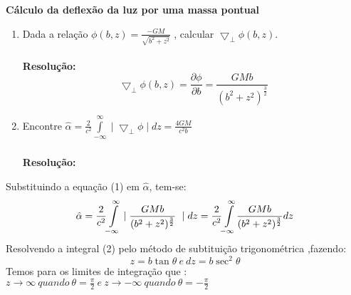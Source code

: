 \documentclass[12pt,a4paper]{article}
\author{Juliene Vargens}
\begin{document}
\begin{center}
\textbf{Cálculo da deflexão da luz por uma massa pontual }\\
\end{center}

\begin{enumerate}

\paragraph{}
\item Dada a relação
$\phi(b,z)=\frac{-GM}{\sqrt{b^2+z^2}}$ , calcular 
$\bigtriangledown_{\perp}\phi(b,z)$.

\paragraph{}\textbf{Resolução:}
\begin{equation}
\bigtriangledown_{\perp}\phi(b,z)=\frac{\partial\phi}{\partial b}={\frac{GMb}{(b^2+z^2)^\frac{3}{2}}}
\end{equation}

\item Encontre $\hat{\alpha}= \frac{2}{c^2}\displaystyle{\int\limits_{-\infty}^{\infty}\mid\bigtriangledown_{\perp}\phi\mid dz =\frac{4GM}{c^2b}}$
\subparagraph{}\textbf{Resolução:}

\end{enumerate}
Substituindo a equação (1) em $\hat{\alpha}$, tem-se:
\begin{equation}
\hat{\alpha}= \frac{2}{c^2}{\displaystyle{\int\limits_{-\infty}^{\infty}}\mid\\ \frac{GMb}{(b^2+z^2)^\frac{3}{2}}\ \mid dz}= \frac{2}{c^2}{\displaystyle{\int\limits_{-\infty}^{\infty}} \frac{GMb}{(b^2+z^2)^\frac{3}{2}} dz}
\end{equation}
Resolvendo a integral (2) pelo método de subtituição trigonométrica ,fazendo:
\begin{equation}
z=b\tan\theta\ e \ dz=b\sec^2\theta
\end{equation}
Temos para os limites de integração que :
$z\rightarrow\infty\ quando\ \theta=\frac{\pi}{2}\ e \ z\rightarrow-\infty\ quando\ \theta=-\frac{\pi}{2}$\\
\end{document}

